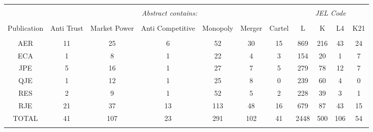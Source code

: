 \documentclass[11pt, letterpaper, twoside]{article}
\begin{document}
\newpage

\begin{table}[!htbp] \centering 
    \caption{} 
    \label{} 

    \begin{adjustbox}{max width=\textwidth}
        \begin{tabular}{@{\extracolsep{5pt}} ccccccccccc} 
            \\[-1.8ex]\hline 
            \hline \\[-1.8ex]
            & \multicolumn{6}{c}{\textit{Abstract contains:}} & \multicolumn{4}{c}{\textit{JEL Code}} \\ 
          \cline{2-7} \cline{8-11} \\
            Publication & Anti Trust & Market Power & Anti Competitive & Monopoly & Merger & Cartel & L & K & L4 & K21 \\ 
            \hline \\[-1.8ex] 
            AER & 11 & 25 & 6 & 52 & 30 & 15 & 869 & 216 & 43 & 24 \\ 
            ECA & 1 & 8 & 1 & 22 & 4 & 3 & 154 & 20 & 1 & 7 \\ 
            JPE & 5 & 16 & 1 & 27 & 7 & 5 & 279 & 78 & 12 & 7 \\ 
            QJE & 1 & 12 & 1 & 25 & 8 & 0 & 239 & 60 & 4 & 0 \\ 
            RES & 2 & 9 & 1 & 52 & 5 & 2 & 228 & 39 & 3 & 1 \\ 
            RJE & 21 & 37 & 13 & 113 & 48 & 16 & 679 & 87 & 43 & 15 \\ 
            TOTAL & 41 & 107 & 23 & 291 & 102 & 41 & 2448 & 500 & 106 & 54 \\ 
            \hline \\[-1.8ex] 
        \end{tabular} 

          
    \end{adjustbox}
    
\end{table} 
\end{document}
